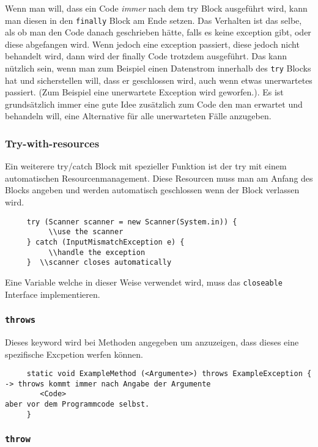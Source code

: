 \documentclass{article}
\begin{document}
	 Wenn man will, dass ein Code \textit{immer} nach dem try Block ausgeführt wird, kann man diesen in den \verb|finally| Block am Ende setzen. Das Verhalten ist das selbe, als ob man den Code danach geschrieben hätte, falls es keine exception gibt, oder diese abgefangen wird. Wenn jedoch eine exception passiert, diese jedoch nicht behandelt wird, dann wird der finally Code trotzdem ausgeführt. Das kann nützlich sein, wenn man zum Beispiel einen Datenstrom innerhalb des \verb|try| Blocks hat und sicherstellen will, dass er geschlossen wird, auch wenn etwas unerwartetes passiert. (Zum Beispiel eine unerwartete Exception wird geworfen.). Es ist grundsätzlich immer eine gute Idee zusätzlich zum Code den man erwartet und behandeln will, eine Alternative für alle unerwarteten Fälle anzugeben.  \\
	 \subsubsection{Try-with-resources}
	 Ein weiterere try/catch Block mit spezieller Funktion ist der try mit einem automatischen Resourcenmanagement. Diese Resourcen muss man am Anfang des Blocks angeben und werden automatisch geschlossen wenn der Block verlassen wird.
	 \begin{verbatim}
	 try (Scanner scanner = new Scanner(System.in)) {
	 	  \\use the scanner
	 } catch (InputMismatchException e) {
	 	  \\handle the exception
	 }  \\scanner closes automatically
	 \end{verbatim}
	 Eine Variable welche in dieser Weise verwendet wird, muss das \verb|closeable| Interface implementieren.
	 \cprotect\subsubsection{\verb|throws|}
	 Dieses keyword wird bei Methoden angegeben um anzuzeigen, dass dieses eine spezifische Excpetion werfen können.
	 \begin{verbatim}
	 static void ExampleMethod (<Argumente>) throws ExampleException { -> throws kommt immer nach Angabe der Argumente
	 	<Code> 	                                                          aber vor dem Programmcode selbst.
	 }
	 \end{verbatim}
	 \cprotect\subsubsection{\verb|throw|} 
\end{document}
